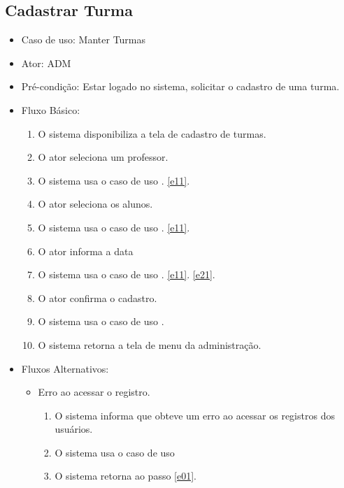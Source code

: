 \documentclass{utfpr-pg}
\begin{document}
    \subsection{Cadastrar Turma}
    
    \begin{itemize}
        \item Caso de uso: Manter Turmas
        \item Ator: ADM
        \item Pré-condição: Estar logado no sistema, solicitar o cadastro de uma turma.
        \item Fluxo Básico:
        \begin{enumerate}[label=\textbf{E0.\arabic*}]
            \item \label{e01} O sistema disponibiliza a tela de cadastro de turmas.
            \item O ator seleciona um professor.
            \item O sistema usa o caso de uso \textbf{\textit{}}. \ref{e11}.
            \item O ator seleciona os alunos.
            \item O sistema usa o caso de uso \textbf{\textit{}}. \ref{e11}.
            \item O ator informa a data
            \item O sistema usa o caso de uso \textbf{\textit{}}. \ref{e11}. \ref{e21}.
            \item O ator confirma o cadastro.
            \item O sistema usa o caso de uso \textbf{\textit{}}.
            \item O sistema retorna a tela de menu da administração.
            
        \end{enumerate}
        
        \item Fluxos Alternativos:
        \begin{itemize}
            \item Erro ao acessar o registro.
            \begin{enumerate}[label=\textbf{E1.\arabic*}]
                \item \label{e11} O sistema informa que obteve um erro ao acessar os registros dos usuários.
                \item O sistema usa o caso de uso \textbf{\textit{}}
                \item O sistema retorna ao passo \ref{e01}.
            \end{enumerate}
            

\end{itemize}
\end{itemize}
\end{document}
